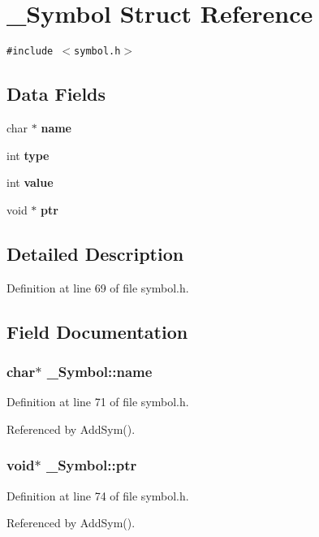 \section{\_\-Symbol Struct Reference}
\label{struct__Symbol}
{\tt \#include $<$symbol.h$>$}

\subsection*{Data Fields}
\begin{CompactItemize}
\item 
char $\ast$ \bf{name}
\item 
int \bf{type}
\item 
int \bf{value}
\item 
void $\ast$ \bf{ptr}
\end{CompactItemize}


\subsection{Detailed Description}




Definition at line 69 of file symbol.h.

\subsection{Field Documentation}
\subsubsection{\setlength{\rightskip}{0pt plus 5cm}char$\ast$ \bf{\_\-Symbol::name}}\label{struct__Symbol_f5a02ff248cc099b5e95f56a3597b301}




Definition at line 71 of file symbol.h.

Referenced by Add\-Sym().
\subsubsection{\setlength{\rightskip}{0pt plus 5cm}void$\ast$ \bf{\_\-Symbol::ptr}}\label{struct__Symbol_56b68aa0582a4346526e9ceb189eeace}




Definition at line 74 of file symbol.h.

Referenced by Add\-Sym().
